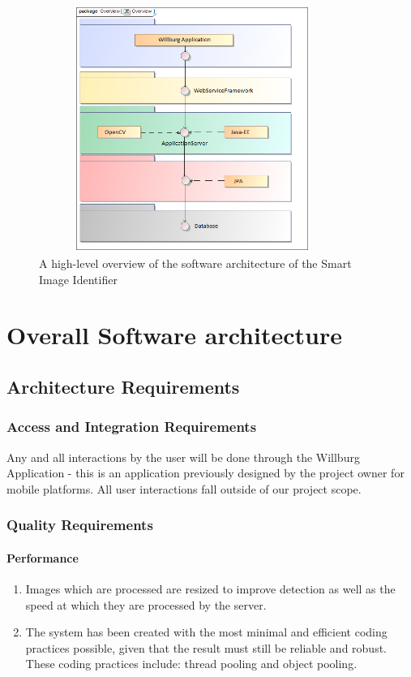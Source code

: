 \documentclass[a4paper,12pt]{report}
\begin{document}
	\begin{figure}[htb]
		\centering
		\includegraphics [height= 8cm, width=10cm]{../Diagrams/SystemOverview.png}
		\caption{A high-level overview of the software architecture of the Smart Image Identifier}
	\end{figure}


\section {Overall Software architecture}	
\subsection{Architecture Requirements}
\subsubsection{Access and Integration Requirements}
Any and all interactions by the user will be done through the Willburg Application - this is an application previously designed by the project owner for mobile platforms. All user interactions fall outside of our project scope. 
\subsubsection{Quality Requirements}
\paragraph{Performance}
\begin{enumerate}
	\item Images which are processed are resized to improve detection as well as the speed at which they are processed by the server.
	\item The system has been created with the most minimal and efficient coding practices possible, given that the result must still be reliable and robust. These coding practices include: thread pooling and object pooling. 
\end{enumerate}
\end{document}
